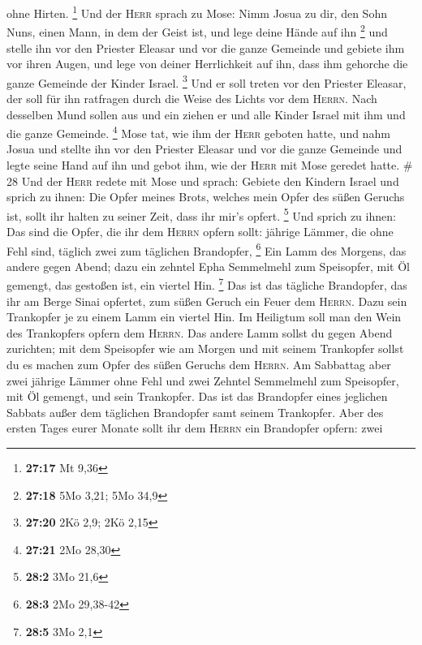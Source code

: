ohne Hirten. \footnote{\textbf{27:17} Mt 9,36}  Und der
\textsc{Herr} sprach zu Mose: Nimm Josua zu dir, den Sohn Nuns, einen
Mann, in dem der Geist ist, und lege deine Hände auf ihn \footnote{\textbf{27:18}
  5Mo 3,21; 5Mo 34,9}  und stelle ihn vor den Priester
Eleasar und vor die ganze Gemeinde und gebiete ihm vor ihren Augen,
 und lege von deiner Herrlichkeit auf ihn, dass ihm
gehorche die ganze Gemeinde der Kinder Israel. \footnote{\textbf{27:20}
  2Kö 2,9; 2Kö 2,15}  Und er soll treten vor den Priester
Eleasar, der soll für ihn ratfragen durch die Weise des Lichts vor dem
\textsc{Herrn}. Nach desselben Mund sollen aus und ein ziehen er und
alle Kinder Israel mit ihm und die ganze Gemeinde. \footnote{\textbf{27:21}
  2Mo 28,30}  Mose tat, wie ihm der \textsc{Herr} geboten
hatte, und nahm Josua und stellte ihn vor den Priester Eleasar und vor
die ganze Gemeinde  und legte seine Hand auf ihn und
gebot ihm, wie der \textsc{Herr} mit Mose geredet hatte. \# 28
 Und der \textsc{Herr} redete mit Mose und sprach:
 Gebiete den Kindern Israel und sprich zu ihnen: Die Opfer
meines Brots, welches mein Opfer des süßen Geruchs ist, sollt ihr halten
zu seiner Zeit, dass ihr mir's opfert. \footnote{\textbf{28:2} 3Mo 21,6}
 Und sprich zu ihnen: Das sind die Opfer, die ihr dem
\textsc{Herrn} opfern sollt: jährige Lämmer, die ohne Fehl sind, täglich
zwei zum täglichen Brandopfer, \footnote{\textbf{28:3} 2Mo 29,38-42}
 Ein Lamm des Morgens, das andere gegen Abend;
 dazu ein zehntel Epha Semmelmehl zum Speisopfer, mit Öl
gemengt, das gestoßen ist, ein viertel Hin. \footnote{\textbf{28:5} 3Mo
  2,1}  Das ist das tägliche Brandopfer, das ihr am Berge
Sinai opfertet, zum süßen Geruch ein Feuer dem \textsc{Herrn}.
 Dazu sein Trankopfer je zu einem Lamm ein viertel Hin. Im
Heiligtum soll man den Wein des Trankopfers opfern dem \textsc{Herrn}.
 Das andere Lamm sollst du gegen Abend zurichten; mit dem
Speisopfer wie am Morgen und mit seinem Trankopfer sollst du es machen
zum Opfer des süßen Geruchs dem \textsc{Herrn}.  Am
Sabbattag aber zwei jährige Lämmer ohne Fehl und zwei Zehntel Semmelmehl
zum Speisopfer, mit Öl gemengt, und sein Trankopfer.  Das
ist das Brandopfer eines jeglichen Sabbats außer dem täglichen
Brandopfer samt seinem Trankopfer.  Aber des ersten Tages
eurer Monate sollt ihr dem \textsc{Herrn} ein Brandopfer opfern: zwei

